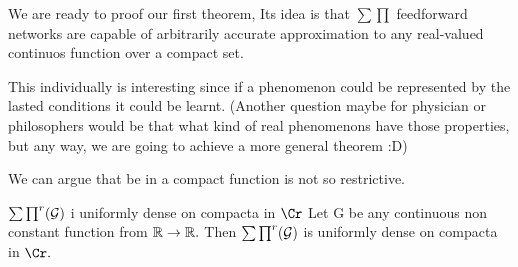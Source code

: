 We are ready to proof our first theorem, Its idea 
is that $\sum \prod$ feedforward networks are capable of arbitrarily accurate approximation to 
any real-valued continuos function over a compact set. 

This individually is interesting since if a phenomenon could be represented by the lasted conditions 
it could be learnt. (Another question maybe for physician or philosophers would be
that what kind of real phenomenons have those properties, but any way, 
we are going to achieve a more general theorem :D) 

We can argue that be in a compact function is not so restrictive. 

\begin{theorem} $\sum \prod ^r ( \mathcal{G})$ i uniformly dense on compacta in $\Cr$
 Let G be any continuous non constant function from $\mathbb{R} \rightarrow \mathbb{R}.$ 
 Then $\sum \prod ^r ( \mathcal{G})$ is uniformly dense on compacta in $\Cr .$   
\end{theorem}

\medskip
\printbibliography


